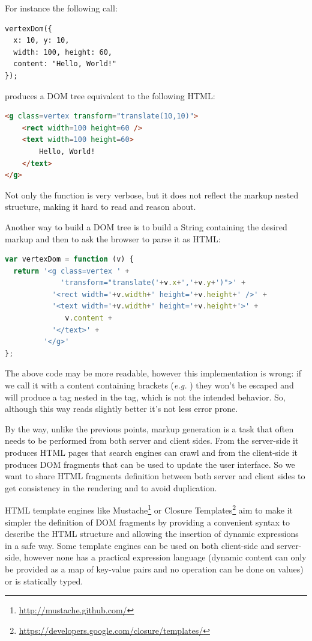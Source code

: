 \documentclass[american,english,runningheads]{llncs}
\newcommand{\eg}{\emph{e.g.}}
\begin{document}
For instance the following call:
\begin{lstlisting}
vertexDom({
  x: 10, y: 10,
  width: 100, height: 60,
  content: "Hello, World!"
});
\end{lstlisting}
produces a DOM tree equivalent to the following HTML:
\begin{lstlisting}[language=HTML]
<g class=vertex transform="translate(10,10)">
    <rect width=100 height=60 />
    <text width=100 height=60>
        Hello, World!
    </text>
</g>
\end{lstlisting}

Not only the  function is very verbose, but it does not reflect the markup nested structure, making
it hard to read and reason about.

Another way to build a DOM tree is to build a String containing the desired markup and then to ask the browser to
parse it as HTML:

\begin{lstlisting}[language=JavaScript]
var vertexDom = function (v) {
  return '<g class=vertex ' +
             'transform="translate('+v.x+','+v.y+')">' +
           '<rect width='+v.width+' height='+v.height+' />' +
           '<text width='+v.width+' height='+v.height+'>' +
              v.content +
           '</text>' +
         '</g>'
};
\end{lstlisting}

The above code may be more readable, however this implementation is wrong: if we call it with a content containing
brackets (\eg{} ) they won’t be escaped and will produce a  tag nested in the  tag,
which is not the intended behavior. So, although this way reads slightly better it’s not less error prone.

By the way, unlike the previous points, markup generation is a task that often needs to be performed from both server
and client sides. From the server-side it produces HTML pages that search engines can crawl and from the client-side
it produces DOM fragments that can be used to update the user interface. So we want to share HTML fragments definition
between both server and client sides to get consistency in the rendering and to avoid duplication.

HTML template engines like Mustache\footnote{\href{http://mustache.github.com/}{http://mustache.github.com/}} or
Closure Templates\footnote{\href{https://developers.google.com/closure/templates/}{https://developers.google.com/closure/templates/}}
aim to make it simpler the definition of DOM fragments by providing a convenient syntax to describe the HTML
structure and allowing the insertion of dynamic expressions in a safe way. Some template engines can be used on both
client-side and server-side, however none has a practical expression language (dynamic content can only be provided
as a map of key-value pairs and no operation can be done on values) or is statically typed.
\end{document}
